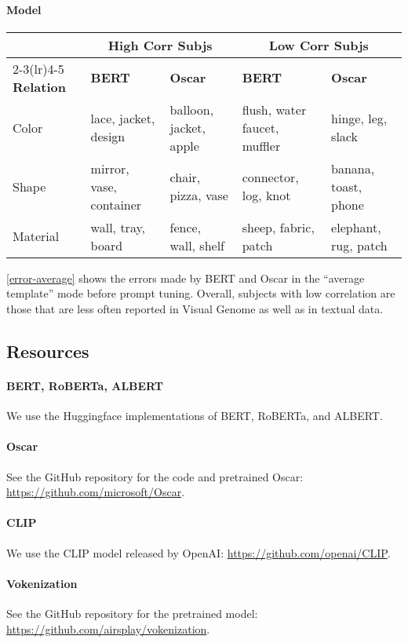 \documentclass[11pt]{article}
\begin{document}
\paragraph{Model}

\begin{table*}[ht]
\small
\centering
\begin{tabular}{l|ll|ll}
\hline
& \multicolumn{2}{c|}{\textbf{High Corr Subjs}} & \multicolumn{2}{c}{\textbf{Low Corr Subjs}}\\
\cmidrule(lr){2-3}\cmidrule(lr){4-5}
\textbf{Relation} & \textbf{BERT} & \textbf{Oscar} & \textbf{BERT} & \textbf{Oscar}\\
\hline
Color & lace, jacket, design & balloon, jacket, apple & flush, water faucet, muffler & hinge, leg, slack\\
Shape & mirror, vase, container & chair, pizza, vase & connector, log, knot & banana, toast, phone\\
Material & wall, tray, board & fence, wall, shelf & sheep, fabric, patch & elephant, rug, patch\\
\hline
\end{tabular}
\caption{\label{error-average}
Three subjects each with high and low correlations for relations color, shape, and material.}
\end{table*}

\cref{error-average} shows the errors made by BERT and Oscar in the ``average template'' mode before prompt tuning. Overall, subjects with low correlation are those that are less often reported in Visual Genome as well as in textual data.


\subsection{Resources}
\label{resources}

\paragraph{BERT, RoBERTa, ALBERT}
We use the Huggingface implementations of BERT, RoBERTa, and ALBERT.

\paragraph{Oscar}
See the GitHub repository for the code and pretrained Oscar: \url{https://github.com/microsoft/Oscar}.

\paragraph{CLIP}
We use the CLIP model released by OpenAI: \url{https://github.com/openai/CLIP}.

\paragraph{Vokenization}
See the GitHub repository for the pretrained model: \url{https://github.com/airsplay/vokenization}.
\end{document}
